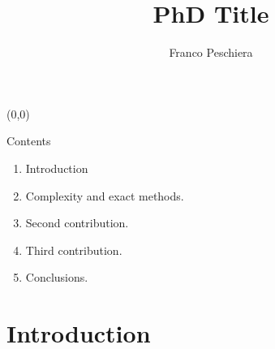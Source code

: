 \documentclass[usenames,dvipsnames]{beamer}
\title{PhD Title}
\author{Franco Peschiera}
\date{}
\begin{document}
{
	\begin{frame}{}%
		\begin{picture}(0,0)%
		\end{picture}
		\vspace{1cm}
		\titlepage
		\vspace{-1cm}
		\begin{figure}%
			\centering
		\end{figure}%
	\end{frame}
}
\addtocounter{framenumber}{-1}

\def\introtitle{Introduction}
\def\oltatitle{Le compromis planification \vs{} re-planification}
\def\ratstitle{Planifier dans un MDP évoluant graduellement avec le temps}
\def\llrltitle{Apprendre dans un MDP évoluant brusquement avec le temps}
\def\conclusiontitle{Conclusion générale}

\def\sommvspace{2em}

\begin{frame}
\tableofcontents[hideallsubsections]
\end{frame}
\begin{frame}

\begin{block}{Contents}

\begin{enumerate}[<+->]

\item \introtitle
\item
  Complexity and exact methods.
\item
  Second contribution.
\item
  Third contribution.
\item
  Conclusions.
\end{enumerate}

\end{block}

\end{frame}

\begin{frame}

\end{frame}

\hypertarget{introduction}{%
\section{Introduction}\label{introduction}}
\end{document}
